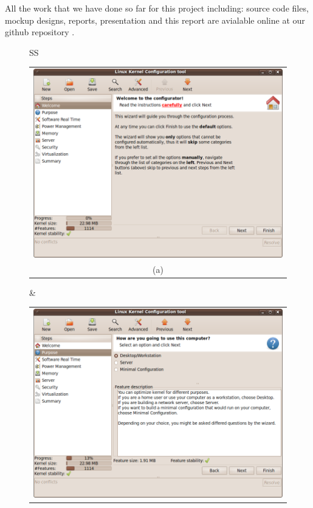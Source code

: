 \documentclass{chi2009}
\begin{document}
All the work that we have done so far for this project including: source code files, mockup designs, reports, presentation and this report are avialable online
at our github repository \cite{git-lkc:2010}.

\begin{figure}[!t]
 \centering
 \begin{tabular}{SS}
 \begin{tabular}{c}
  \includegraphics[scale=0.25,keepaspectratio=true]{figs/lkc-final1} \\
  (a) \\
 \end{tabular}
  & 
\begin{tabular}{c}
  \includegraphics[scale=0.25,keepaspectratio=true]{figs/lkc-final2} \\

\end{tabular}
\end{tabular}
\end{figure}
\end{document}
